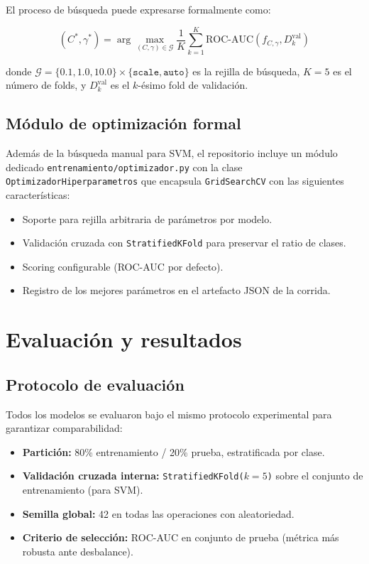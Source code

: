 \documentclass[12pt,a4paper]{article}
\begin{document}
El proceso de búsqueda puede expresarse formalmente como:

\begin{equation}
  (C^*, \gamma^*) = \arg\max_{(C,\gamma) \in \mathcal{G}} \frac{1}{K}\sum_{k=1}^{K} \text{ROC-AUC}(f_{C,\gamma}, D_k^{\text{val}})
\end{equation}

donde $\mathcal{G} = \{0.1, 1.0, 10.0\} \times \{\texttt{scale}, \texttt{auto}\}$ es la rejilla de búsqueda, $K=5$ es el número de folds, y $D_k^{\text{val}}$ es el $k$-ésimo fold de validación.

\subsection{Módulo de optimización formal}

Además de la búsqueda manual para SVM, el repositorio incluye un módulo dedicado \texttt{entrenamiento/optimizador.py} con la clase \texttt{OptimizadorHiperparametros} que encapsula \texttt{GridSearchCV} con las siguientes características:

\begin{itemize}[noitemsep]
  \item Soporte para rejilla arbitraria de parámetros por modelo.
  \item Validación cruzada con \texttt{StratifiedKFold} para preservar el ratio de clases.
  \item Scoring configurable (ROC-AUC por defecto).
  \item Registro de los mejores parámetros en el artefacto JSON de la corrida.
\end{itemize}

\section{Evaluación y resultados}

\subsection{Protocolo de evaluación}

Todos los modelos se evaluaron bajo el mismo protocolo experimental para garantizar comparabilidad:

\begin{itemize}[noitemsep]
  \item \textbf{Partición:} 80\% entrenamiento / 20\% prueba, estratificada por clase.
  \item \textbf{Validación cruzada interna:} \texttt{StratifiedKFold($k=5$)} sobre el conjunto de entrenamiento (para SVM).
  \item \textbf{Semilla global:} 42 en todas las operaciones con aleatoriedad.
  \item \textbf{Criterio de selección:} ROC-AUC en conjunto de prueba (métrica más robusta ante desbalance).
\end{itemize}
\end{document}
